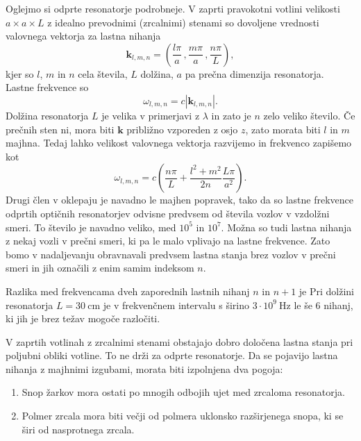 Oglejmo si odprte resonatorje podrobneje. V zaprti pravokotni votlini velikosti
$a\times a\times L$ z idealno prevodnimi (zrcalnimi) stenami so dovoljene vrednosti
valovnega vektorja za lastna nihanja 
\begin{equation}
\mathbf{k}_{l,m,n}=\left(\frac{l\pi}{a}\,,\frac{m\pi}{a}\,,\frac{n\pi}{L}\right),\label{eq:k-votlina}
\end{equation}
 kjer so $l$, $m$ in $n$ cela števila, $L$ dolžina, $a$ pa prečna
dimenzija resonatorja. Lastne frekvence so 
\begin{equation}
\omega_{l,m,n}=c|\mathbf{k}_{l,m,n}|.\label{eq:omega-votlina}
\end{equation}
Dolžina resonatorja $L$ je velika v primerjavi z $\lambda$ in zato je $n$
zelo veliko število. Če prečnih sten ni, mora biti $\mathbf{k}$ približno
vzporeden z osjo $z$, zato morata biti $l$ in $m$ majhna. Tedaj
lahko velikost valovnega vektorja razvijemo in frekvenco zapišemo kot
\begin{equation}
\omega_{l,m,n}=c\left(\frac{n\pi}{L}+\frac{l^{2}+m^{2}}{2n}\frac{L \pi}{a^{2}}\right).
\label{eq:delta-omega-resonator-razvoj}
\end{equation}
Drugi člen v oklepaju je navadno le majhen popravek, tako da so
lastne frekvence odprtih optičnih resonatorjev odvisne predvsem od
števila vozlov v vzdolžni smeri. To število je navadno veliko, med $10^{5}$
in $10^{7}$. Možna so tudi lastna nihanja z nekaj vozli v prečni
smeri, ki pa le malo vplivajo na lastne frekvence. Zato bomo v nadaljevanju
obravnavali predvsem lastna stanja brez vozlov v prečni smeri in
jih označili z enim samim indeksom $n$.

Razlika med frekvencama dveh zaporednih lastnih nihanj 
$n$ in $n+1$ je
Pri dolžini resonatorja $L=30~\si{\centi\metre}$ je v frekvenčnem
intervalu s širino $3\cdot10^{9}~\si{\hertz}$ le še $6$ nihanj, ki jih
je brez težav mogoče razločiti.

V zaprtih votlinah z zrcalnimi stenami obstajajo dobro določena lastna
stanja pri poljubni obliki votline. To ne drži za odprte resonatorje.
Da se pojavijo lastna nihanja z majhnimi izgubami, morata
biti izpolnjena dva pogoja:

\begin{enumerate} 
\item Snop žarkov mora ostati po mnogih odbojih ujet med zrcaloma resonatorja.\\
\item Polmer zrcala mora biti večji od polmera uklonsko razširjenega snopa, ki se širi od nasprotnega zrcala. 
\end{enumerate}


